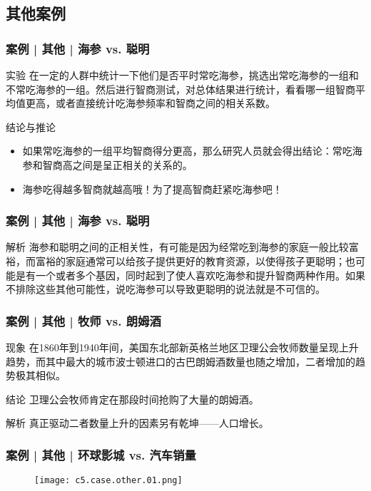 \subsection{其他案例}
\begin{frame}
  \frametitle{案例 | 其他 | 海参 vs. 聪明}
  \begin{block}{实验}
在一定的人群中统计一下他们是否平时常吃海参，挑选出常吃海参的一组和不常吃海参的一组。然后进行智商测试，对总体结果进行统计，看看哪一组智商平均值更高，或者直接统计吃海参频率和智商之间的相关系数。
  \end{block}
  \pause
  \begin{block}{结论与推论}
    \begin{itemize}
      \item 如果常吃海参的一组平均智商得分更高，那么研究人员就会得出结论：常吃海参和智商高之间是呈正相关的关系的。
      \item 海参吃得越多智商就越高哦！为了提高智商赶紧吃海参吧！
    \end{itemize}
  \end{block}
\end{frame}

\begin{frame}
  \frametitle{案例 | 其他 | 海参 vs. 聪明}
  \begin{block}{解析}
海参和聪明之间的正相关性，有可能是因为经常吃到海参的家庭一般比较富裕，而富裕的家庭通常可以给孩子提供更好的教育资源，以使得孩子更聪明；也可能是有一个或者多个基因，同时起到了使人喜欢吃海参和提升智商两种作用。如果不排除这些其他可能性，说吃海参可以导致更聪明的说法就是不可信的。
  \end{block}
\end{frame}

\begin{frame}
  \frametitle{案例 | 其他 | 牧师 vs. 朗姆酒}
  \begin{block}{现象}
 在1860年到1940年间，美国东北部新英格兰地区卫理公会牧师数量呈现上升趋势，而其中最大的城市波士顿进口的古巴朗姆酒数量也随之增加，二者增加的趋势极其相似。
    \end{block}
  \pause
  \begin{block}{结论}
卫理公会牧师肯定在那段时间抢购了大量的朗姆酒。
  \end{block}
  \pause \pause \pause \pause
  \begin{block}{解析}
真正驱动二者数量上升的因素另有乾坤——人口增长。
  \end{block}
\end{frame}

\begin{frame}
  \frametitle{案例 | 其他 | 环球影城 vs. 汽车销量}
  \begin{figure}
    \centering
    \texttt{[image: c5.case.other.01.png]}
  \end{figure}
\end{frame}

